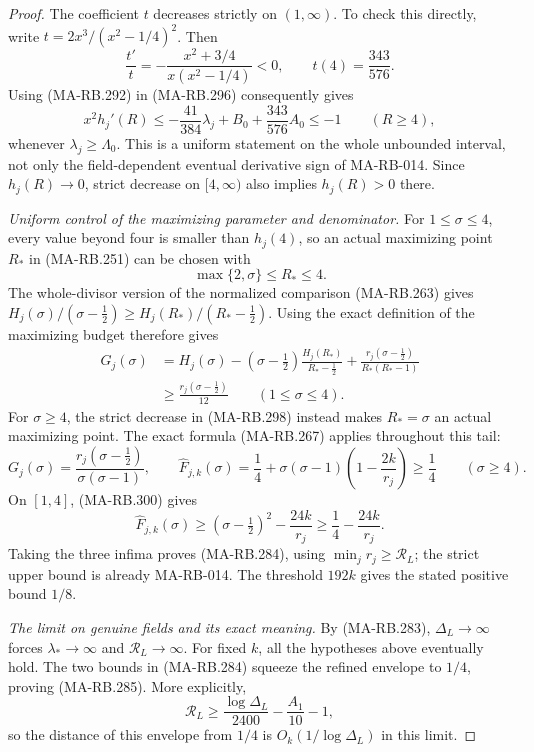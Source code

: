 \begin{proof}
The coefficient \(t\) decreases strictly on \((1,\infty)\).
To check this directly, write
\(t=2x^3/(x^2-1/4)^2\). Then
\[
 \frac{t'}t
       =-\frac{x^2+3/4}{x(x^2-1/4)}<0,
              \qquad t(4)=\frac{343}{576}.
 \tag{MA-RB.297}
\]
Using (MA-RB.292) in (MA-RB.296) consequently gives
\[
 x^2h_j'(R)
    \le-\frac{41}{384}\lambda_j
                    +B_0+\frac{343}{576}A_0
    \le-1\qquad(R\ge4),
 \tag{MA-RB.298}
\]
whenever \(\lambda_j\ge\Lambda_0\).
This is a uniform statement on the whole unbounded interval,
not only the field-dependent eventual derivative sign of
MA-RB-014. Since \(h_j(R)\to0\), strict decrease on
\([4,\infty)\) also implies \(h_j(R)>0\) there.

\emph{Uniform control of the maximizing parameter and denominator.}
For \(1\le\sigma\le4\), every value beyond four is
smaller than \(h_j(4)\), so an actual maximizing point
\(R_*\) in (MA-RB.251) can be chosen with
\[
                    \max\{2,\sigma\}\le R_*\le4.
 \tag{MA-RB.299}
\]
The whole-divisor version of the normalized comparison
(MA-RB.263) gives
\(H_j(\sigma)/(\sigma-\tfrac12)
 \ge H_j(R_*)/(R_*-\tfrac12)\).
Using the exact definition of the maximizing budget therefore
gives
\[
 \begin{aligned}
 G_j(\sigma)
  &=H_j(\sigma)-(\sigma-\tfrac12)
                \frac{H_j(R_*)}{R_*-\tfrac12}
       +\frac{r_j(\sigma-\tfrac12)}{R_*(R_*-1)}\\
  &\ge\frac{r_j(\sigma-\tfrac12)}{12}
                                    \qquad(1\le\sigma\le4).
 \end{aligned}
 \tag{MA-RB.300}
\]
For \(\sigma\ge4\), the strict decrease in (MA-RB.298)
instead makes \(R_* =\sigma\) an actual maximizing point.
The exact formula (MA-RB.267) applies throughout this tail:
\[
 G_j(\sigma)=\frac{r_j(\sigma-\tfrac12)}{\sigma(\sigma-1)},
 \qquad
 \widehat F_{j,k}(\sigma)
    =\frac14+\sigma(\sigma-1)\left(1-\frac{2k}{r_j}\right)
          \ge\frac14\qquad(\sigma\ge4).
 \tag{MA-RB.301}
\]
On \([1,4]\), (MA-RB.300) gives
\[
 \widehat F_{j,k}(\sigma)
       \ge(\sigma-\tfrac12)^2-\frac{24k}{r_j}
       \ge\frac14-\frac{24k}{r_j}.
 \tag{MA-RB.302}
\]
Taking the three infima proves (MA-RB.284), using
\(\min_jr_j\ge\mathcal R_L\); the strict upper bound
is already MA-RB-014. The threshold \(192k\) gives
the stated positive bound \(1/8\).

\emph{The limit on genuine fields and its exact meaning.}
By (MA-RB.283), \(\Delta_L\to\infty\) forces
\(\lambda_*\to\infty\) and \(\mathcal R_L\to\infty\).
For fixed \(k\), all the hypotheses above eventually hold.
The two bounds in (MA-RB.284) squeeze the refined envelope
to \(1/4\), proving (MA-RB.285). More explicitly,
\[
 \mathcal R_L\ge\frac{\log\Delta_L}{2400}
                              -\frac{A_1}{10}-1,
 \tag{MA-RB.303}
\]
so the distance of this envelope from \(1/4\) is
\(O_k(1/\log\Delta_L)\) in this limit.


\end{proof}
